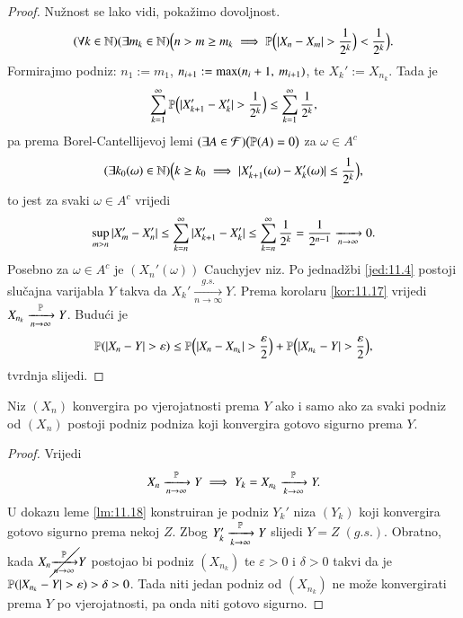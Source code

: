 \begin{proof}
    Nu\v znost se lako vidi, poka\v zimo dovoljnost.
    \begin{equation*}
        (\forall k \in \nat)(\exists m_k \in \nat)\Big(n > m \geq m_k \implies \masP \Big( |X_n - X_m|>\frac{1}{2^k} \Big) < \frac{1}{2^k} \Big).
    \end{equation*}
    Formirajmo podniz: $n_1 := m_1$, $n_{i + 1} := \max ({n_i + 1}, \: {m_{i + 1}})$, te $X_k' := X_{n_k}$.
    Tada je
    \begin{equation*}
        \sum\limits_{k = 1}^{\infty} \mathbb{P} \Big( |X_{k + 1}' - X_k'| > \frac{1}{2^k} \Big) \leq \sum\limits_{k = 1}^{\infty} \frac{1}{2^k},    
    \end{equation*}
    pa prema Borel-Cantellijevoj lemi $(\exists A \in \mathcal{F}) \big(\mathbb{P}({A}) = 0 \big)$ za $\omega \in A^c$
    \begin{equation*}
        (\exists k_0 (\omega) \in \mathbb{N}) \Big(k \geq k_0 \implies |X_{k + 1}'(\omega) - X_k' (\omega)| \leq \frac{1}{2^k} \Big),
    \end{equation*}
    to jest za svaki $\omega \in A^c$ vrijedi
    \begin{equation*}
        \sup\limits_{m > n} |X_m' - X_n'| \leq \sum\limits_{k = n}^{\infty} |X_{k + 1}' - X_k'| \leq \sum\limits_{k = n}^{\infty} \frac{1}{2^k} = \frac{1}{2^{n - 1}} \xrightarrow[n \to \infty]{} 0.
    \end{equation*}
    Posebno za $\omega \in A^c$ je $(X_n' (\omega))$ Cauchyjev niz.
    Po jednad\v zbi \eqref{jed:11.4} postoji slu\v cajna varijabla $Y$ takva da $X_k' \xrightarrow[n \to \infty]{g.s.} Y$.
    Prema korolaru \ref{kor:11.17} vrijedi $X_{n_k} \xrightarrow[n \to \infty]{\mathbb{P}} Y$.
    Budu\' ci je
    \begin{equation*}
        \mathbb{P}({|X_n - Y| > \varepsilon}) \leq \mathbb{P} \Big(  |X_n - X_{n_k}| > \frac{\varepsilon}{2} \Big) + \mathbb{P} \Big( |X_{n_k} - Y| > \frac{\varepsilon}{2} \Big),    
    \end{equation*}
    tvrdnja slijedi. 
\end{proof}

\begin{tm} \label{tm:11.19}
    Niz $(X_n)$ konvergira po vjerojatnosti prema $Y$ ako i samo ako za svaki podniz od $(X_n)$ postoji podniz podniza koji konvergira gotovo sigurno prema $Y$.
\end{tm}

\begin{proof}
    Vrijedi
    \begin{equation*}
        X_n \xrightarrow[n \to \infty]{\mathbb{P}} Y \implies Y_k = X_{n_k} \xrightarrow[k \to \infty]{\mathbb{P}} Y.
    \end{equation*}
    U dokazu leme \ref{lm:11.18} konstruiran je podniz $Y_k'$ niza $(Y_k)$ koji konvergira gotovo sigurno prema nekoj $Z$.
    Zbog $Y_k' \xrightarrow[k \to \infty]{\mathbb{P}} Y$ slijedi $Y=Z \; (g.s.)$.
    Obratno, kada $X_n \cancel{\xrightarrow[n \to \infty]{\mathbb{P}}} Y$ postojao bi podniz $(X_{n_k})$ te $\varepsilon > 0$ i $\delta > 0$ takvi da je $\mathbb{P}({|X_{n_k} - Y| > \varepsilon}) > \delta > 0$.
    Tada niti jedan podniz od $(X_{n_k})$ ne mo\v ze konvergirati prema $Y$ po vjerojatnosti, pa onda niti gotovo sigurno.
\end{proof}

